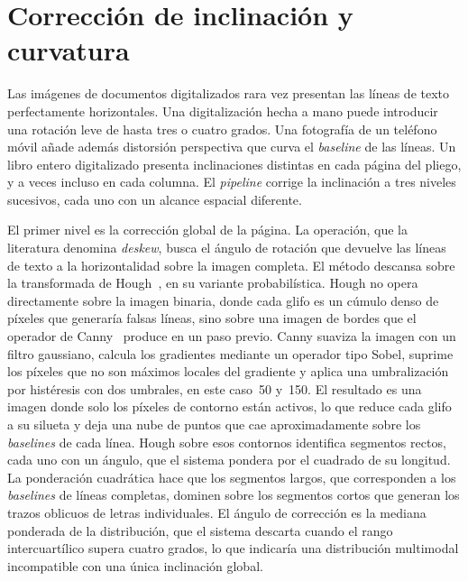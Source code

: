 \section{Corrección de inclinación y curvatura}
\label{sec:correccion-inclinacion}

Las imágenes de documentos digitalizados rara vez presentan las líneas de texto perfectamente horizontales. Una digitalización hecha a mano puede introducir una rotación leve de hasta tres o cuatro grados. Una fotografía de un teléfono móvil añade además distorsión perspectiva que curva el \textit{baseline} de las líneas. Un libro entero digitalizado presenta inclinaciones distintas en cada página del pliego, y a veces incluso en cada columna. El \textit{pipeline} corrige la inclinación a tres niveles sucesivos, cada uno con un alcance espacial diferente.

El primer nivel es la corrección global de la página. La operación, que la literatura denomina \textit{deskew}, busca el ángulo de rotación que devuelve las líneas de texto a la horizontalidad sobre la imagen completa. El método descansa sobre la transformada de Hough~\cite{duda1972hough}, en su variante probabilística. Hough no opera directamente sobre la imagen binaria, donde cada glifo es un cúmulo denso de píxeles que generaría falsas líneas, sino sobre una imagen de bordes que el operador de Canny~\cite{canny1986edge} produce en un paso previo. Canny suaviza la imagen con un filtro gaussiano, calcula los gradientes mediante un operador tipo Sobel, suprime los píxeles que no son máximos locales del gradiente y aplica una umbralización por histéresis con dos umbrales, en este caso~50 y~150. El resultado es una imagen donde solo los píxeles de contorno están activos, lo que reduce cada glifo a su silueta y deja una nube de puntos que cae aproximadamente sobre los \textit{baselines} de cada línea. Hough sobre esos contornos identifica segmentos rectos, cada uno con un ángulo, que el sistema pondera por el cuadrado de su longitud. La ponderación cuadrática hace que los segmentos largos, que corresponden a los \textit{baselines} de líneas completas, dominen sobre los segmentos cortos que generan los trazos oblicuos de letras individuales. El ángulo de corrección es la mediana ponderada de la distribución, que el sistema descarta cuando el rango intercuartílico supera cuatro grados, lo que indicaría una distribución multimodal incompatible con una única inclinación global.


